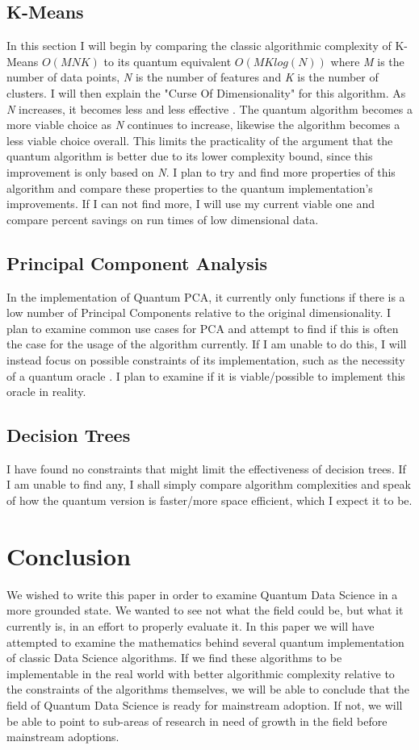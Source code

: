 \documentclass[conference]{IEEEtran}
\begin{document}
\subsection{K-Means}
In this section I will begin by comparing the classic algorithmic complexity of K-Means $O(MNK)$ to its quantum equivalent $O(MKlog(N))$ where \emph{M} is the number of data points, \emph{N} is the number of features and \emph{K} is the number of clusters. I will then explain the "Curse Of Dimensionality" for this algorithm. As \emph{N} increases, it becomes less and less effective \cite{b15}. The quantum algorithm becomes a more viable choice as \emph{N} continues to increase, likewise the algorithm becomes a less viable choice overall. This limits the practicality of the argument that the quantum algorithm is better due to its lower complexity bound, since this improvement is only based on \emph{N}. I plan to try and find more properties of this algorithm and compare these properties to the quantum implementation's improvements. If I can not find more, I will use my current viable one and compare percent savings on run times of low dimensional data. 

\subsection{Principal Component Analysis}
In the implementation of Quantum PCA, it currently only functions if there is a low number of Principal Components relative to the original dimensionality. I plan to examine common use cases for PCA and attempt to find if this is often the case for the usage of the algorithm currently. If I am unable to do this, I will instead focus on possible constraints of its implementation, such as the necessity of a quantum oracle \cite{b7}. I plan to examine if it is viable/possible to implement this oracle in reality.  
\subsection{Decision Trees}
I have found no constraints that might limit the effectiveness of decision trees. If I am unable to find any, I shall simply compare algorithm complexities and speak of how the quantum version is faster/more space efficient, which I expect it to be. 

\section{Conclusion}
We wished to write this paper in order to examine Quantum Data Science in a more grounded state. We wanted to see not what the field could be, but what it currently is, in an effort to properly evaluate it. In this paper we will have attempted to examine the mathematics behind several quantum implementation of classic Data Science algorithms. If we find these algorithms to be implementable in the real world with better algorithmic complexity relative to the constraints of the algorithms themselves, we will be able to conclude that the field of Quantum Data Science is ready for mainstream adoption. If not, we will be able to point to sub-areas of research in need of growth in the field before mainstream adoptions.  
\end{document}
